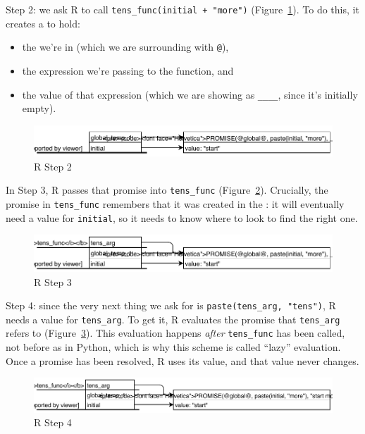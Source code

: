 Step 2: we ask R to call \texttt{tens\_func(initial + "more")}
(Figure~\ref{fig:r-step-2}).
To do this,
it creates a  to hold:

\begin{itemize}
\item
  the  we're in (which we are surrounding with \texttt{@}),
\item
  the expression we're passing to the function, and
\item
  the value of that expression (which we are showing as \texttt{\_\_\_\_}, since it's initially empty).
\end{itemize}

\begin{figure}[h]
  \includegraphics{figures/nse/r-step-02.pdf}
  \caption{R Step 2}
  \label{fig:r-step-2}
\end{figure}

In Step 3,
R passes that promise into \texttt{tens\_func}
(Figure~\ref{fig:r-step-3}).
Crucially,
the promise in \texttt{tens\_func} remembers that
it was created in the :
it will eventually need a value for \texttt{initial},
so it needs to know where to look to find the right one.

\begin{figure}[h]
  \includegraphics{figures/nse/r-step-03.pdf}
  \caption{R Step 3}
  \label{fig:r-step-3}
\end{figure}

Step 4: since the very next thing we ask for is \texttt{paste(tens\_arg, "tens")},
R needs a value for \texttt{tens\_arg}.
To get it,
R evaluates the promise that \texttt{tens\_arg} refers to
(Figure~\ref{fig:r-step-4}).
This evaluation happens \emph{after} \texttt{tens\_func} has been called,
not before as in Python,
which is why this scheme is called ``lazy'' evaluation.
Once a promise has been resolved,
R uses its value,
and that value never changes.

\begin{figure}[h]
  \includegraphics{figures/nse/r-step-04.pdf}
  \caption{R Step 4}
  \label{fig:r-step-4}
\end{figure}

